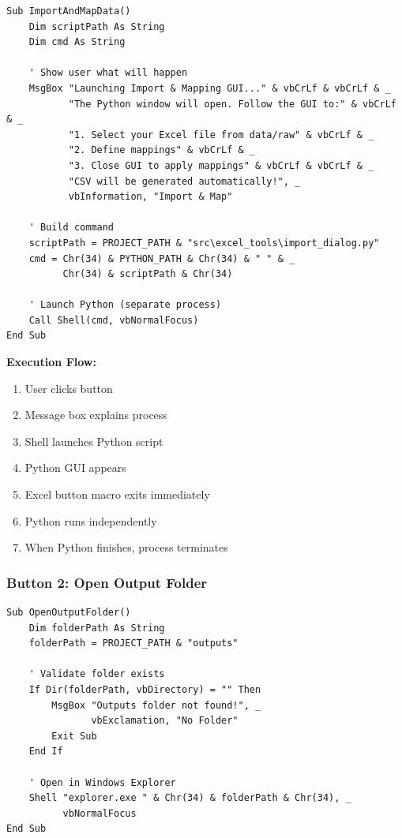 \begin{lstlisting}[style=vbastyle]
Sub ImportAndMapData()
    Dim scriptPath As String
    Dim cmd As String
    
    ' Show user what will happen
    MsgBox "Launching Import & Mapping GUI..." & vbCrLf & vbCrLf & _
           "The Python window will open. Follow the GUI to:" & vbCrLf & _
           "1. Select your Excel file from data/raw" & vbCrLf & _
           "2. Define mappings" & vbCrLf & _
           "3. Close GUI to apply mappings" & vbCrLf & vbCrLf & _
           "CSV will be generated automatically!", _
           vbInformation, "Import & Map"
    
    ' Build command
    scriptPath = PROJECT_PATH & "src\excel_tools\import_dialog.py"
    cmd = Chr(34) & PYTHON_PATH & Chr(34) & " " & _
          Chr(34) & scriptPath & Chr(34)
    
    ' Launch Python (separate process)
    Call Shell(cmd, vbNormalFocus)
End Sub
\end{lstlisting}

\textbf{Execution Flow:}
\begin{enumerate}
    \item User clicks button
    \item Message box explains process
    \item Shell launches Python script
    \item Python GUI appears
    \item Excel button macro exits immediately
    \item Python runs independently
    \item When Python finishes, process terminates
\end{enumerate}

\subsubsection{Button 2: Open Output Folder}

\begin{lstlisting}[style=vbastyle]
Sub OpenOutputFolder()
    Dim folderPath As String
    folderPath = PROJECT_PATH & "outputs"
    
    ' Validate folder exists
    If Dir(folderPath, vbDirectory) = "" Then
        MsgBox "Outputs folder not found!", _
               vbExclamation, "No Folder"
        Exit Sub
    End If
    
    ' Open in Windows Explorer
    Shell "explorer.exe " & Chr(34) & folderPath & Chr(34), _
          vbNormalFocus
End Sub
\end{lstlisting}


